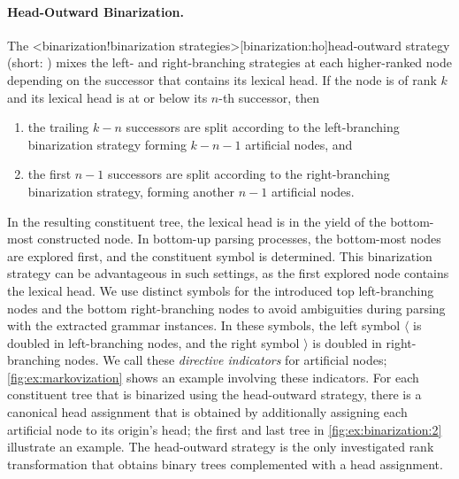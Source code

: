 \documentclass[../../document.tex]{subfiles}
\begin{document}
    \paragraph{Head-Outward Binarization.}
    The <binarization!binarization strategies>[binarization:ho]{head-outward strategy} (short: ) mixes the left- and right-branching strategies at each higher-ranked node depending on the successor that contains its lexical head.
    If the node is of rank \(k\) and its lexical head is at or below its \(n\)-th successor, then
    \begin{enumerate}
        \item the trailing \(k-n\) successors are split according to the left-branching binarization strategy forming \(k-n-1\) artificial nodes, and
        \item the first \(n-1\) successors are split according to the right-branching binarization strategy, forming another \(n-1\) artificial nodes.
    \end{enumerate}
    In the resulting constituent tree, the lexical head is in the yield of the bottom-most constructed node.
    In bottom-up parsing processes, the bottom-most nodes are explored first, and the constituent symbol is determined.
    This binarization strategy can be advantageous in such settings, as the first explored node contains the lexical head.
    We use distinct symbols for the introduced top left-branching nodes and the bottom right-branching nodes to avoid ambiguities during parsing with the extracted grammar instances.
    In these symbols, the left symbol \(\langle\) is doubled in left-branching nodes, and the right symbol \(\rangle\) is doubled in right-branching nodes.
    We call these \emph{directive indicators} for artificial nodes; \cref{fig:ex:markovization} shows an example involving these indicators.
    For each constituent tree that is binarized using the head-outward strategy, there is a canonical head assignment that is obtained by additionally assigning each artificial node to its origin's head; the first and last tree in \cref{fig:ex:binarization:2} illustrate an example.
    The head-outward strategy is the only investigated rank transformation that obtains binary trees complemented with a head assignment.
\end{document}
